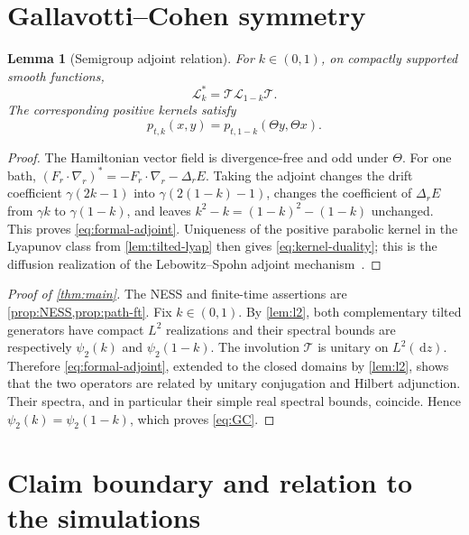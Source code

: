 \documentclass[11pt]{article}
\newtheorem{lemma}[theorem]{Lemma}
\theoremstyle{remark}
\newcommand{\dd}{\,\mathrm d}
\newcommand{\cL}{\mathcal L}
\newcommand{\Thetaop}{\mathcal T}
\begin{document}
\section{Gallavotti--Cohen symmetry}

\begin{lemma}[Semigroup adjoint relation]\label{lem:adjoint}
For $k\in(0,1)$, on compactly supported smooth functions,
\begin{equation}\label{eq:formal-adjoint}
 \cL_k^*=\Thetaop\cL_{1-k}\Thetaop.
\end{equation}
The corresponding positive kernels satisfy
\begin{equation}\label{eq:kernel-duality}
 p_{t,k}(x,y)=p_{t,1-k}(\Theta y,\Theta x).
\end{equation}
\end{lemma}

\begin{proof}
The Hamiltonian vector field is divergence-free and odd under $\Theta$.
For one bath,
$(F_r\cdot\nabla_r)^*=-F_r\cdot\nabla_r-\Delta_rE$.
Taking the adjoint changes the drift coefficient
$\gamma(2k-1)$ into $\gamma(2(1-k)-1)$, changes the coefficient of
$\Delta_rE$ from $\gamma k$ to $\gamma(1-k)$, and leaves
$k^2-k=(1-k)^2-(1-k)$ unchanged.  This proves
\eqref{eq:formal-adjoint}.  Uniqueness of the positive parabolic kernel in
the Lyapunov class from \cref{lem:tilted-lyap} then gives
\eqref{eq:kernel-duality}; this is the diffusion realization of the
Lebowitz--Spohn adjoint mechanism~\cite{LebowitzSpohn1999}.
\end{proof}

\begin{proof}[Proof of \cref{thm:main}]
The NESS and finite-time assertions are \cref{prop:NESS,prop:path-ft}.
Fix $k\in(0,1)$.  By \cref{lem:l2}, both complementary tilted generators
have compact $L^2$ realizations and their spectral bounds are respectively
$\psi_2(k)$ and $\psi_2(1-k)$.  The involution $\Thetaop$ is unitary on
$L^2(\dd z)$.  Therefore \eqref{eq:formal-adjoint}, extended to the closed
domains by \cref{lem:l2}, shows that the two operators are related by unitary
conjugation and Hilbert adjunction.  Their spectra, and in particular their
simple real spectral bounds, coincide.  Hence
$\psi_2(k)=\psi_2(1-k)$, which proves \eqref{eq:GC}.
\end{proof}

\section{Claim boundary and relation to the simulations}
\end{document}
